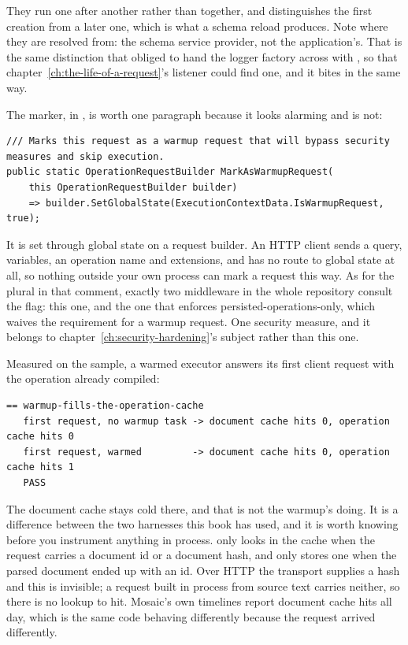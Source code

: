 They run one after another rather than together, and 
distinguishes the first creation from a later one, which is what a schema reload
produces. Note where they are resolved from: the schema service provider, not
the application's. That is the same distinction that obliged
 to hand the logger factory across with
, so that
chapter~\ref{ch:the-life-of-a-request}'s listener could find one, and it bites
in the same way.

%
The marker, in , is worth one
paragraph because it looks alarming and is not:

\begin{verbatim}
/// Marks this request as a warmup request that will bypass security measures and skip execution.
public static OperationRequestBuilder MarkAsWarmupRequest(
    this OperationRequestBuilder builder)
    => builder.SetGlobalState(ExecutionContextData.IsWarmupRequest, true);
\end{verbatim}

It is set through global state on a request builder. An HTTP client sends a
query, variables, an operation name and extensions, and has no route to global
state at all, so nothing outside your own process can mark a request this way.
As for the plural in that comment, exactly two middleware in the whole
repository consult the flag: this one, and the one that enforces
persisted-operations-only, which waives the requirement for a warmup request.
One security measure, and it belongs to
chapter~\ref{ch:security-hardening}'s subject rather than this one.

%
Measured on the sample, a warmed executor answers its first client request with
the operation already compiled:

\begin{verbatim}
== warmup-fills-the-operation-cache
   first request, no warmup task -> document cache hits 0, operation cache hits 0
   first request, warmed         -> document cache hits 0, operation cache hits 1
   PASS
\end{verbatim}

%
The document cache stays cold there, and that is not the warmup's doing. It is a
difference between the two harnesses this book has used, and it is worth knowing
before you instrument anything in process.  only
looks in the cache when the request carries a document id or a document hash,
and only stores one when the parsed document ended up with an id. Over HTTP the
transport supplies a hash and this is invisible; a request built in process from
source text carries neither, so there is no lookup to hit. Mosaic's own
timelines report document cache hits all day, which is the same code behaving
differently because the request arrived differently.

